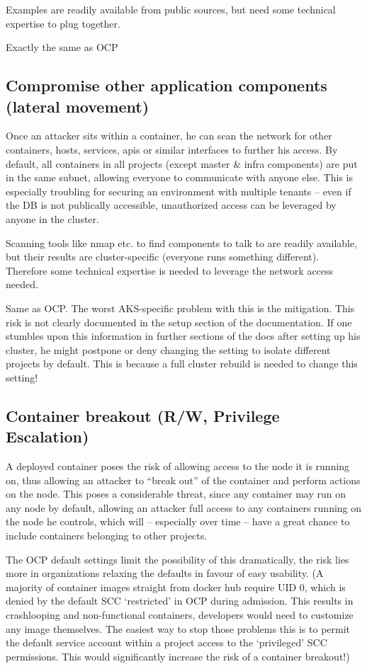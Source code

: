 Examples are readily available from public sources, but need some technical expertise to plug together.

Exactly the same as OCP

\subsection{Compromise other application components (lateral movement)}
Once an attacker sits within a container, he can scan the network for other containers, hosts, services, apis or similar interfaces to further his access. By default, all containers in all projects (except master \& infra components) are put in the same subnet, allowing everyone to communicate with anyone else.
This is especially troubling for securing an environment with multiple tenants – even if the DB is not publically accessible, unauthorized access can be leveraged by anyone in the cluster.

Scanning tools like nmap etc. to find components to talk to are readily available, but their results are cluster-specific (everyone runs something different). Therefore some technical expertise is needed to leverage the network access needed. 

Same as OCP. 
The worst AKS-specific problem with this is the mitigation. This risk is not clearly documented in the setup section of the documentation. If one stumbles upon this information in further sections of the docs after setting up his cluster, he might postpone or deny changing the setting to isolate different projects by default. This is because a full cluster rebuild is needed to change this setting!

\subsection{Container breakout (R/W, Privilege Escalation)}
A deployed container poses the risk of allowing access to the node it is running on, thus allowing an attacker to “break out” of the container and perform actions on the node.
This poses a considerable threat, since any container may run on any node by default, allowing an attacker full access to any containers running on the node he controls, which will – especially over time – have a great chance to include containers belonging to other projects.

The OCP default settings limit the possibility of this dramatically, the risk lies more in organizations relaxing the defaults in favour of easy usability. (A majority of container images straight from docker hub require UID 0, which is denied by the default SCC ‘restricted’ in OCP during admission. This results in crashlooping and non-functional containers, developers would need to customize any image themselves. The easiest way to stop those problems this is to permit the default service account within a project access to the ‘privileged’ SCC permissions. This would significantly increase the risk of a container breakout!)

